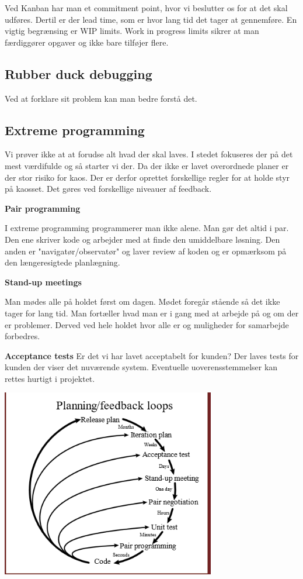 Ved Kanban har man et commitment point, hvor vi beslutter os for at det skal udføres.
Dertil er der lead time, som er hvor lang tid det tager at gennemføre. En vigtig begrænsing er  WIP limits.
Work in progress limits sikrer at man færdiggører opgaver og ikke bare tilføjer flere.


\subsection{Rubber duck debugging}
Ved at forklare sit problem kan man bedre forstå det.

\subsection{Extreme programming}
Vi prøver ikke at at forudse alt hvad der skal laves. I stedet fokuseres
der på det mest værdifulde og så starter vi der. Da der ikke er lavet
overordnede planer er der stor risiko for kaos. Der er derfor oprettet
forskellige regler for at holde styr på kaosset. Det gøres ved forskellige
niveauer af feedback.

\textbf{Pair programming}

I extreme programming programmerer man ikke alene. Man gør det altid i par.
Den ene skriver kode og arbejder med at finde den umiddelbare løsning.
Den anden er "navigatør/observatør" og laver review af koden og er
opmærksom på den længeresigtede planlægning.

\textbf{Stand-up meetings}

Man mødes alle på holdet først om dagen. Mødet foregår stående så det
ikke tager for lang tid. Man fortæller hvad man er i gang med at arbejde på
og om der er problemer. Derved ved hele holdet hvor alle er og muligheder
for samarbejde forbedres.

\textbf{Acceptance tests}
Er det vi har lavet acceptabelt for kunden? Der laves tests for kunden
der viser det nuværende system. Eventuelle uoverensstemmelser kan rettes
hurtigt i projektet.


\begin{center}
	\includegraphics[width=0.7\textwidth]{Images/extreme.png}
\end{center}


